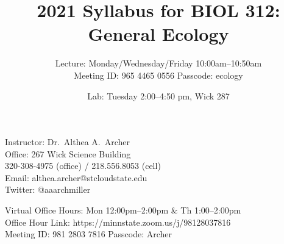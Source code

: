 \documentclass{tufte-handout}
\title{2021 Syllabus for BIOL 312: General Ecology}										%
\author{Lecture: Monday/Wednesday/Friday 10:00am--10:50am \\
\color{red} Meeting ID: 965 4465 0556
Passcode: ecology \color{black}}								%
\date{Lab: Tuesday 2:00--4:50 pm, Wick 287}
\begin{document}
\maketitle

Instructor: Dr.~Althea A.~Archer\\
Office: 267 Wick Science Building\\
320-308-4975 (office) / 218.556.8053 (cell)\\
Email: althea.archer@stcloudstate.edu\\
Twitter: @aaarchmiller

\color{gray} Virtual Office Hours: Mon 12:00pm--2:00pm \& Th 1:00--2:00pm\\
Office Hour Link: https://minnstate.zoom.us/j/98128037816\\
Meeting ID: 981 2803 7816 Passcode: Archer \color{black}
\end{document}
